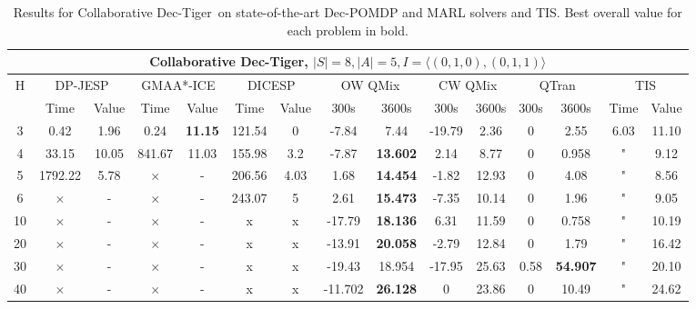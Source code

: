 \documentclass[runningheads]{llncs}
\newcommand{\cdt}[0]{Collaborative Dec-Tiger}
\begin{document}
 \begin{table}[t]
 \centering
 \scriptsize
 \begin{tabular}{|c||c|c||c|c||c|c||c|c||c|c||c|c||c|c||}
         \hline
         \multicolumn{15}{|c|}{\cdt,  $|S|=8, |A|=5, I=\langle(0,1,0),(0,1,1)\rangle$} \\
         \hline
         H & \multicolumn{2}{|c||}{DP-JESP} & \multicolumn{2}{c||}{GMAA*-ICE} &
         \multicolumn{2}{c||}{DICESP} %
         & \multicolumn{2}{c||}{OW QMix} & \multicolumn{2}{c||}{CW QMix} & \multicolumn{2}{c||}{QTran} & \multicolumn{2}{c||}{TIS} \\
                  \hline
         \ & Time & Value & Time & Value & Time & Value %
         & 300s & 3600s & 300s & 3600s & 300s &  3600s & Time & Value\\
         \hline
         3 & 0.42 & 1.96 & 0.24 & \textbf{11.15} & 121.54 & 0    %
         & -7.84 &  7.44  & -19.79 &   2.36  & 0 &  2.55 & 6.03 & 11.10 \\
         \hline
         4 & 33.15 & 10.05 & 841.67 & 11.03 & 155.98 & 3.2    %
         & -7.87 &  \textbf{13.602}  & 2.14 &  8.77  & 0 &  0.958 & " & 9.12 \\ 
         \hline
         5 & 1792.22 & 5.78 & $\times$ & - & 206.56 & 4.03   %
         & 1.68 &  \textbf{14.454}  & -1.82 &  12.93  & 0 &  4.08 & " & 8.56  \\
         \hline
         6 & $\times$ & - & $\times$ & - & 243.07 & 5    %
         & 2.61 & \textbf{15.473}  & -7.35 &  10.14  & 0 &  1.96 & "  & 9.05 \\
         \hline
          10 & $\times$ & - & $\times$ & -  & x & x    %
          & -17.79 &  \textbf{18.136}  & 6.31 &  11.59  & 0 &  0.758 & "  & 10.19\\
         \hline
          20 & $\times$ & - & $\times$ & -  & x & x     %
          & -13.91 &  \textbf{20.058}  & -2.79 &  12.84  & 0 &  1.79 & "  & 16.42 \\
         \hline
          30 & $\times$ & - & $\times$ & -  & x & x    %
          & -19.43 &  18.954  & -17.95 &  25.63  & 0.58 &  \textbf{54.907} & "  & 20.10 \\
         \hline
          40 & $\times$ & - & $\times$ & -  & x & x   %
          & -11.702 &  \textbf{26.128}  & 0 &  23.86  & 0 &  10.49 & "  & 24.62 \\
         \hline
    \end{tabular}
    
    \caption{\label{tbl:scale_CDT} Results for \cdt\ on state-of-the-art Dec-POMDP and MARL solvers and TIS. Best overall value for each problem in bold.
    }
    \vspace{-4mm}
\end{table}
\end{document}
